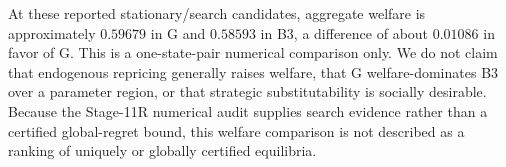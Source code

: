 \begin{table}[t]
\centering
\caption{Welfare at the repaired reported states}
\label{tab:welfare}

\end{table}

At these reported stationary/search candidates, aggregate welfare is approximately $0.59679$ in G and $0.58593$ in B3, a difference of about $0.01086$ in favor of G. This is a one-state-pair numerical comparison only. We do not claim that endogenous repricing generally raises welfare, that G welfare-dominates B3 over a parameter region, or that strategic substitutability is socially desirable. Because the Stage-11R numerical audit supplies search evidence rather than a certified global-regret bound, this welfare comparison is not described as a ranking of uniquely or globally certified equilibria.
